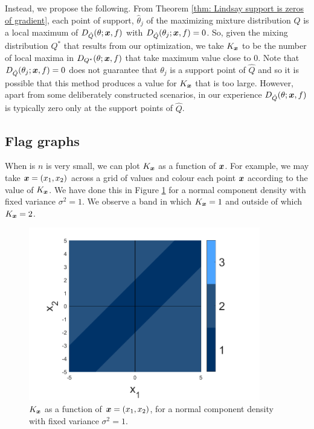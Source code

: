 	Instead, we propose the following. From Theorem \ref{thm: Lindsay support is zeros of gradient}, each point of support, $\hat{\theta}_j$ of the maximizing mixture distribution $\hat{Q}$ is a local maximum of $D_{\hat{Q}}(\theta;{\bm{{x}}}, f)$ with $D_{\hat{Q}}(\theta_j;{\bm{{x}}},f) = 0$. So, given the mixing distribution $Q^*$ that results from our optimization, we take $K_{\bm{{x}}}$ to be the number of local maxima in $D_{Q^*}(\theta;{\bm{{x}}}, f)$ that take maximum value close to $0$. Note that $D_{\hat{Q}}(\theta_j; {\bm{{x}}}, f) = 0$ does not guarantee that $\theta_j$ is a support point of $\hat{Q}$ and so it is possible that this method produces a value for $K_{\bm{{x}}}$ that is too large. However, apart from some deliberately constructed scenarios, in our experience $D_{\hat{Q}}(\theta;{\bm{{x}}}, f)$ is typically zero only at the support points of $\hat{Q}$.



	\subsection{Flag graphs}
	\label{sec: flag graphs}
	When is $n$ is very small, we can plot $K_{\bm{{x}}}$ as a function of ${\bm{{x}}}$. For example, we may take ${\bm{{x}}} = (x_1, x_2)$ across a grid of values and colour each point ${\bm{{x}}}$ according to the value of $K_{\bm{{x}}}$. We have done this in Figure \ref{fig:normal_flag_graph_n2} for a normal component density with fixed variance $\sigma^2 = 1$. We observe a band in which $K_{\bm{{x}}} = 1$ and outside of which $K_{\bm{{x}}} = 2$.

	\begin{figure}
		\centering
		\includegraphics[width = 0.9\textwidth]{Figures/Mixtures/normal_flag_graph_n2.png}
		\caption{$K_{\bm{{x}}}$ as a function of ${\bm{{x}}} = (x_1, x_2)$, for a normal component density with fixed variance $\sigma^2 = 1$.}
		\label{fig:normal_flag_graph_n2}
	\end{figure}

